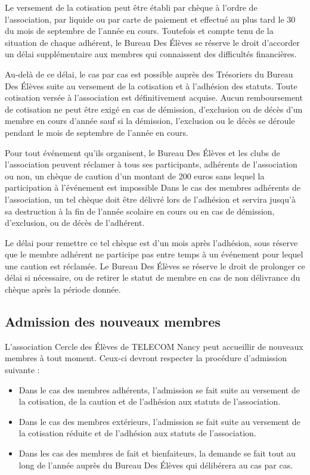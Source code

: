 \documentclass{article} %
\begin{document}
			Le versement de la cotisation peut être établi par chèque à l’ordre
			de l’association, par liquide ou par carte de paiement et effectué
			au plus tard le 30 du mois de septembre de l’année en cours.
			Toutefois et compte tenu de la situation de chaque adhérent, le
			Bureau Des Élèves se réserve le droit d’accorder un délai
			supplémentaire aux membres qui connaissent des difficultés
			financières.

			Au-delà de ce délai, le cas par cas est possible auprès des
			Trésoriers du Bureau Des Élèves suite au versement de la cotisation
			et à l’adhésion des statuts. Toute cotisation versée à l’association
			est définitivement acquise. Aucun remboursement de cotisation ne
			peut être exigé en cas de démission, d’exclusion ou de décès d’un
			membre en cours d’année sauf si la démission, l’exclusion ou le
			décès se déroule pendant le mois de septembre de l’année en cours.

			Pour tout événement qu’ils organisent, le Bureau Des Élèves et les
			clubs de l’association peuvent réclamer à tous ses participants,
			adhérents de l’association ou non, un chèque de caution d’un montant
			de 200 euros sans lequel la participation à l’événement est
			impossible Dans le cas des membres adhérents de l’association, un
			tel chèque doit être délivré lors de l’adhésion et servira jusqu’à
			sa destruction à la fin de l’année scolaire en cours ou en cas de
			démission, d’exclusion, ou de décès de l’adhérent. 

			Le délai pour remettre ce tel chèque est d’un mois après l’adhésion,
			sous réserve que le membre adhérent ne participe pas entre temps à
			un événement pour lequel une caution est réclamée. Le Bureau Des
			Élèves se réserve le droit de prolonger ce délai si nécessaire, ou
			de retirer le statut de membre en cas de non délivrance du chèque
			après la période donnée. 

		\subsection{Admission des nouveaux membres}
			
			L’association Cercle des Élèves de TELECOM Nancy peut accueillir de
			nouveaux membres à tout moment. Ceux-ci devront respecter la
			procédure d’admission suivante :
			\begin{itemize}
				\item Dans le cas des membres adhérents, l’admission se fait
					suite au versement de la cotisation, de la caution et de
					l’adhésion aux statuts de l’association.
				\item Dans le cas des membres extérieurs, l’admission se fait
					suite au versement de la cotisation réduite et de l’adhésion
					aux statuts de l’association.
				\item Dans les cas des membres de fait et bienfaiteurs, la
					demande se fait tout au long de l’année auprès du Bureau Des
					Élèves qui délibérera au cas par cas.
			\end{itemize}
\end{document}
